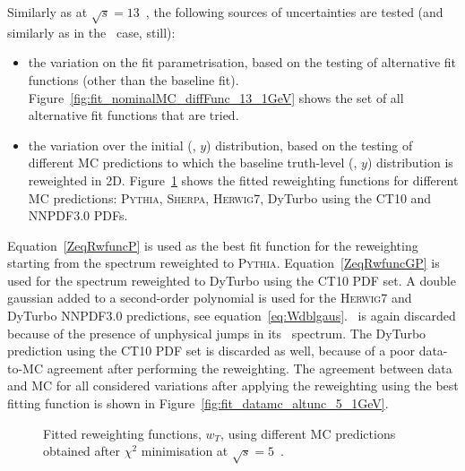 Similarly as at $\sqrt{s} = 13$~\TeV,  the following sources of uncertainties are tested (and similarly as in the \Wboson\ case, still):
\begin{itemize}
\item the variation on the fit parametrisation, based on the testing of alternative fit functions (other than the baseline fit). Figure~\ref{fig:fit_nominalMC_diffFunc_13_1GeV} shows the set of all alternative fit functions that are tried.
\item the variation over the initial (\ptz, $y$) distribution, based on the testing of different MC predictions to which the baseline truth-level (\ptz, $y$) distribution is reweighted in 2D. Figure~\ref{fig:fit_nominalMC_diffMC_5_1GeV} shows the fitted reweighting functions for different MC predictions: \textsc{Pythia}, \textsc{Sherpa}, \textsc{Herwig7}, DyTurbo using the CT10 and NNPDF3.0 PDFs.
\end{itemize}

Equation~\ref{ZeqRwfuncP} is used as the best fit function for the reweighting starting from the spectrum reweighted to \textsc{Pythia}.  Equation~\ref{ZeqRwfuncGP} is used for the spectrum reweighted to DyTurbo using the CT10 PDF set.
A double gaussian added to a second-order polynomial is used for the \textsc{Herwig7} and DyTurbo NNPDF3.0 predictions, see equation~\ref{eq:Wdblgaus}.
\Sherpa\ is again discarded because of the presence of unphysical jumps in its \pttruthv\ spectrum.
The DyTurbo prediction using the CT10 PDF set is discarded as well, because of a poor data-to-MC agreement after performing the reweighting.
The agreement between data and MC for all considered variations after applying the reweighting using the best fitting function is shown in Figure~\ref{fig:fit_datamc_altunc_5_1GeV}.

\begin{figure}[h]
\centering
{}
\caption{Fitted reweighting functions, $w_{T}$, using different MC predictions obtained after $\chi^2$ minimisation at $\sqrt{s} = 5$~\TeV. }
\label{fig:fit_nominalMC_diffMC_5_1GeV}
\end{figure}

